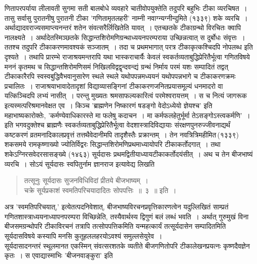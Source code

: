 \documentclass[11pt, openany]{book}
\begin{document}
\newpage

\begin{sloppypar}
\noindent णितापरपर्याया लीलावती सुगमा सती बालबोधे व्यवहारे चातीवोपयुक्तेति तदुपरि बहुभिः टीका व्यरचिषत~। तासु सर्वासु पुरातनीषु पुरातनी टीका 'गणितामृतलहरी' नाम्नी नवाग्न्यग्नीन्दुमिते (१३३९) शके व्यरचि~। अर्थाद्यादवराज्यसमाप्त्यनन्तरं शतेन संवत्सरैर्लिखितेति यावत्~। एतच्छतके टीकाग्रन्थो विरचितः क्वापि नालक्ष्यते~। अर्थादेतस्मिञ्छतके सिद्धान्तशिरोमणिग्रन्थाध्ययनपरम्पराया उच्छिन्नत्वात् स दुर्बोधः संवृत्तः~। ततश्च तदुपरि टीकाकरणमावश्यकं सञ्जातम्~। तदा च प्रथमभागात् परत्र टीकाकृत्कश्चिदपि नोपलब्ध इति दृश्यते~। तथापि प्रारम्भे राजाश्रयमन्तरापि यथा भास्कराचार्यैः केवलं स्वकर्तव्यताबुद्धिप्रेरितैर्भूत्वा गणितविषये मननं कृतमथ च सिद्धान्तशिरोमणिसमं निखिलविद्वद्वृन्दवन्द्यं ग्रन्थं निर्माय परमं यशः सम्पादितं तद्वत् टीकाकारैरपि स्वस्वबुद्धिवैभवानुसारेण स्थले स्थले यथोपपन्नमध्ययनं यथोपपन्नभागे च टीकाकरणक्रमः प्रचालितः~। राजाश्रयाभावादेतादृशां विद्याव्यासङ्गिनां टीकाकरणजनितप्रयासमूल्यं धनमादरो वा यत्किञ्चिदपि लभ्यं नासीत्~। परन्तु मुख्यतः श्रमसाफल्यकारित्वं परमेश्वरायत्तम्~। स च नित्यं जागरूक इत्यस्मत्परिश्रमानवेक्षत एव~। किञ्च 'ब्राह्मणेन निष्कारणं षडङ्गो वेदोऽध्येयो ज्ञेयश्च' इति महाभाष्यकारोक्तेः, {\color{violet}'कर्मण्येवाधिकारस्ते मा फलेषु कदाचन~। मा कर्मफलहेतुर्भूर्मा तेऽसङ्गोऽस्त्वकर्मणि'}~। इति भगवदुक्तेश्च ब्राह्मणैः स्वकर्तव्यताबुद्धिप्रेरितैर्भूत्वा वेदशास्त्रादिविद्यायाः संरक्षणपुनरुज्जीवनाद्यर्थं कष्टकरणं व्रतमनादिकालप्रवृत्तं तत्तथैवेदानीमपि तादृशैस्तैः प्रक्रान्तम्~। तेन नवत्रित्रिमहीमित\textendash \,(१३३९)\textendash \,शकसमये रामकृष्णाख्यो ज्योतिर्विद्वरः सिद्धान्तशिरोमणिप्रथमाध्यायोपरि टीकाकर्तोदगात्~। तथा शकेऽग्निरसवेदरसासङ्ख्ये (१४६३) सूर्यदासः प्रथमद्वितीयाध्यायटीकाकर्तोदयंसीत्~। अथ च तेन बीजभाष्यं व्यरचि~। सोऽयं सूर्यदासः स्वपितुर्नाम ज्ञानराज इत्यावेद्य लिखति\textendash 

\begin{quote}
{\color{violet}तत्सूनुः सूर्यदासः सुजनविधिविदां प्रीतये बीजभाष्यम्~।\\
चक्रे सूर्यप्रकाशं स्वमतिपरिचयादादितः सोपपत्तिः~॥~३~॥} इति~।
\end{quote}

अत्र 'स्वमतिपरिचयात्,' इत्येतत्पदनिवेशात्, बीजभाष्यविरचनप्रवृत्तिकारणत्वेन यदुल्लिखितं साम्प्रतं गणितशास्त्राध्ययनाध्यापनपरम्परा विच्छिन्नेति, तस्यैवार्थस्य द्विगुणं बलं लब्धं भवति~। अर्थात् गुरुमुखं विना बीजसमग्रन्थोपरि टीकाविरचनं तत्रापि तत्सोपपत्तिकमिति यन्महत्कार्यं तत्सूर्यदासेन सम्पादितमिति सूर्यदासविषये कस्यापि मनसि कुतूहललहरयोऽवश्यं समुल्लसेयुरेव~।\\

सूर्यदासादनन्तरं स्थूलमानत एकस्मिन् संवत्सरशतके व्यतीते बीजगणितोपरि टीकालेखनप्रयत्नः कृष्णदैवज्ञेन कृतः~। स एवाद्यास्माभिः 'बीजनवाङ्कुरा' इति
\end{sloppypar}
\end{document}
